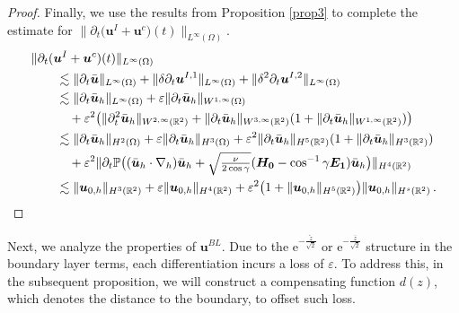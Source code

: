\documentclass[pdflatex,sn-mathphys-num]{sn-jnl}%
\theoremstyle{thmstyleone}%
\theoremstyle{thmstyletwo}%
\theoremstyle{thmstylethree}%
\theoremstyle{thmstyletwo}
\begin{document}
\begin{proof}
	
	Finally,  we use the results from Proposition \ref{prop3} to complete the estimate for $\lVert \partial_t
	\big(
	\boldsymbol{u}^{I} 
	+\boldsymbol{u}^{c}\big)(t) \rVert_{L^{\infty}(\Omega)}$.
	\begin{align*}
		&\lVert \partial_t(\boldsymbol{u}^{I}+\boldsymbol{u}^{c})(t) \rVert_{L^\infty(\Omega)}\\
		&\qquad\lesssim\lVert \partial_t\bar{\boldsymbol{u}} \rVert_{L^\infty(\Omega)}
		+\lVert \delta\partial_t\boldsymbol{u}^{I,1} \rVert_{L^\infty(\Omega)}
		+\lVert \delta^2\partial_t\boldsymbol{u}^{I,2} \rVert_{L^{\infty}(\Omega)}
		\\\notag
		&\qquad\lesssim	 
		\lVert \partial_t\bar{\boldsymbol{u}}_h \rVert_{L^{\infty}(\Omega)}
		+\varepsilon
		\lVert \partial_t\bar{\boldsymbol{u}}_h \rVert_{W^{1,\infty}(\Omega)}
		\\\notag
		&\qquad\quad+\varepsilon^2\big(
		\lVert \partial^2_t\bar{\boldsymbol{u}}_h \rVert_{W^{2,\infty}(\mathbb{R}^2)}
		+\lVert \partial_t\bar{\boldsymbol{u}}_h \rVert_{W^{3,\infty}(\mathbb{R}^2)}
		(1+\lVert \partial_t\bar{\boldsymbol{u}}_h \rVert_{W^{1,\infty}(\mathbb{R}^2)})
		\big)
		\\\notag
		&\qquad\lesssim 
		\lVert \partial_t\bar{\boldsymbol{u}}_h \rVert_{H^{2}(\Omega)}
		+\varepsilon
		\lVert \partial_t\bar{\boldsymbol{u}}_h \rVert_{H^{3}(\Omega)}
		+\varepsilon^2
		\lVert \partial_t\bar{\boldsymbol{u}}_h \rVert_{H^{5}(\mathbb{R}^2)}
		(1+\lVert \partial_t\bar{\boldsymbol{u}}_h \rVert_{H^{3}(\mathbb{R}^2)})
		\\\notag
		&\qquad\quad+\varepsilon^2
		\lVert 
		\partial_t\mathbb{P}\big(
		(\bar {\boldsymbol u}_h \cdot \nabla_h) \bar {\boldsymbol u}_h+\sqrt{\tfrac{\nu}{2\cos\gamma}}
		(\boldsymbol{H_0}
		-\cos^{-1}\gamma\boldsymbol{E_1})
		\bar{\boldsymbol u}_h
		\big)
		\rVert_{H^{4}(\mathbb{R}^2)}
		\\\notag
		&\qquad\lesssim
		\lVert{\boldsymbol{u}}_{0,h}\rVert_{H^{3}(\mathbb{R}^2)}
		+\varepsilon
		\lVert{\boldsymbol{u}}_{0,h}\rVert_{H^{4}(\mathbb{R}^2)}
		+\varepsilon^2
		\big(
		1+
		\lVert {\boldsymbol{u}}_{0,h} \rVert_{H^{5}(\mathbb{R}^2)}
		\big)\lVert {\boldsymbol{u}}_{0,h} \rVert_{H^{s}(\mathbb{R}^2)}
		\,.\notag
	\end{align*}
\end{proof}	

Next, we analyze the properties of $\boldsymbol{u}^{BL}$. Due to the $\mathrm{e}^{-\frac{\tilde{z}}{\sqrt{2}}}$ or $\mathrm{e}^{-\frac{\bar{z}}{\sqrt{2}}}$ structure in the boundary layer terms, each differentiation incurs a loss of $\varepsilon$. To address this, in the subsequent proposition,  we will construct a compensating function $d(z)$, which denotes the distance to the boundary, to offset such loss.
\end{document}
